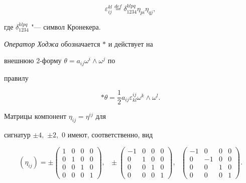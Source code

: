 \begin{equation}

\varepsilon _{ij}^{kl}\overset{def}{=}\delta _{1234}^{klpq}\eta _{pi}\eta

_{qj},  \label{kriv:9}

\end{equation}

где $\delta _{1234}^{klpq}$ "--- символ Кронекера. 

\textit{Оператор  Ходжа} обозначается $\ast $ и действует на 

внешнюю 2-форму $\theta =a_{ij}\omega ^{i}\wedge \omega ^{j}$ по 

правилу

\begin{equation}

\ast \theta =\frac{1}{2}a_{ij}\varepsilon _{kl}^{ij}\omega ^{k}\wedge \omega

^{l}.  \label{kriv:11}

\end{equation}

Матрицы компонент $\eta _{ij}=\eta ^{ij}$ для

сигнатур $\pm 4,$ $\pm 2,$ $0 $ имеют, соответственно, вид

\begin{equation*}

\left( \eta _{ij}\right) =\pm \left( 

\begin{array}{cccc}

1 & 0 & 0 & 0 \\ 

0 & 1 & 0 & 0 \\ 

0 & 0 & 1 & 0 \\ 

0 & 0 & 0 & 1\end{array}\right) ,\text{ \ \ }\pm \left( 

\begin{array}{cccc}

-1 & 0 & 0 & 0 \\ 

0 & 1 & 0 & 0 \\ 

0 & 0 & 1 & 0 \\ 

0 & 0 & 0 & 1\end{array}\right) ,\text{ \ \ }\left( 

\begin{array}{cccc}

-1 & 0 & 0 & 0 \\ 

0 & -1 & 0 & 0 \\ 

0 & 0 & 1 & 0 \\ 

0 & 0 & 0 & 1\end{array}\right) .

\end{equation*}

